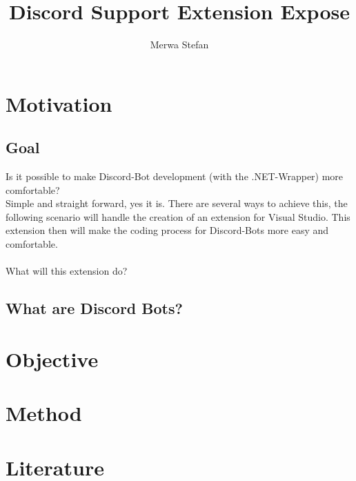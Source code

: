 \documentclass[]{article}
\title{Discord Support Extension Expose}
\author{Merwa Stefan}
\begin{document}
\maketitle

\section{Motivation}
\subsection{Goal}
Is it possible to make Discord-Bot development (with the .NET-Wrapper) more comfortable?\\
Simple and straight forward, yes it is. There are several ways to achieve this, the following scenario will handle the creation of an extension for Visual Studio. This extension then will make the coding process for Discord-Bots more easy and comfortable.\\\\
What will this extension do?\\


\subsection{What are Discord Bots?}

\section{Objective}

\section{Method}

\section{Literature}

	
\end{document}
